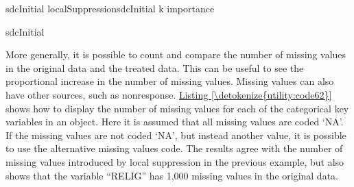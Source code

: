 \documentclass[letterpaper,10pt,english]{sphinxmanual}
\begin{document}
\def\sphinxLiteralBlockLabel{\label{\detokenize{utility:code61}}}
%
\begin{sphinxVerbatim}[commandchars=\\\{\},numbers=left,firstnumber=1,stepnumber=1]
sdcInitial  localSuppressionsdcInitial k   importance  

sdcInitial 

\end{sphinxVerbatim}

More generally, it is possible to count and compare the number of
missing values in the original data and the treated data. This can be
useful to see the proportional increase in the number of missing values.
Missing values can also have other sources, such as nonresponse. \hyperref[\detokenize{utility:code62}]{Listing \ref{\detokenize{utility:code62}}}
shows how to display the number of missing values for each of the
categorical key variables in an  object. Here it is assumed
that all missing values are coded ‘NA’. If the missing values are not
coded ‘NA’, but instead another value, it is possible to use the
alternative missing values code. The results agree with the number of
missing values introduced by local suppression in the previous example,
but also shows that the variable “RELIG” has 1,000 missing values in the
original data.
\end{document}
